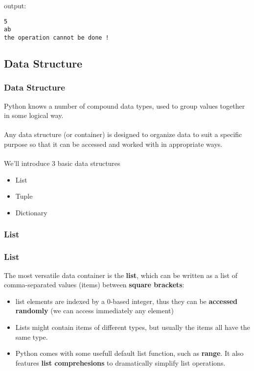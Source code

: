 \documentclass{beamer}
\begin{document}
\begin{frame}[fragile]
\justifying
output:
     \begin{Verbatim}[commandchars=\\\{\}]
5
ab
the operation cannot be done !

    \end{Verbatim}
\end{frame}

\subsection{Data Structure}
\begin{frame}
\justifying
\frametitle{Data Structure} 
Python knows a number of compound data types, used to group values together in some logical way. 
\\~\\ 
Any data structure (or container) is designed to organize data to suit a specific purpose so that it can be accessed and worked with in appropriate ways.
\\~\\ 
We'll introduce 3 basic data structures
\begin{itemize}
\item List
\item Tuple
\item Dictionary
\end{itemize}
\end{frame}

\subsubsection{List}
\begin{frame}
\justifying
\frametitle{List} 
The most versatile data container is the \textbf{list},
which can be written as a list of comma-separated values (items) between
\textbf{square brackets}: 
\begin{itemize}
\item list elements are indexed by a 0-based integer,
thus they can be \textbf{accessed randomly} (we can access immediately any
 element)
\item Lists might contain items of different types, but usually the items all have the same type.
\item Python comes with some usefull default list function, such as \textbf{range}. It also features 
\textbf{list comprehesions} to dramatically simplify list operations.
\end{itemize}
\end{frame}
\end{document}
